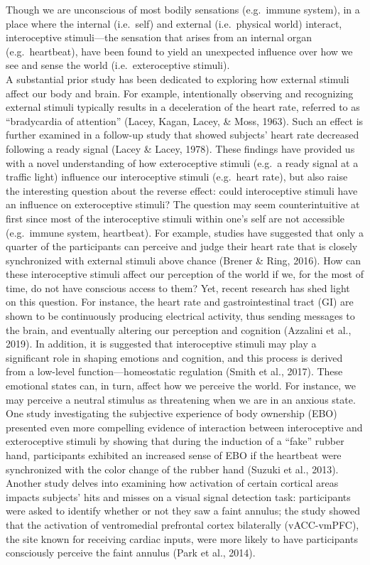 \documentclass[
  man]{apa6}
\begin{document}
Though we are unconscious of most bodily sensations (e.g.~immune system), in a place where the internal (i.e.~self) and external (i.e.~physical world) interact, interoceptive stimuli---the sensation that arises from an internal organ (e.g.~heartbeat), have been found to yield an unexpected influence over how we see and sense the world (i.e.~exteroceptive stimuli).\\
A substantial prior study has been dedicated to exploring how external stimuli affect our body and brain. For example, intentionally observing and recognizing external stimuli typically results in a deceleration of the heart rate, referred to as ``bradycardia of attention'' (Lacey, Kagan, Lacey, \& Moss, 1963). Such an effect is further examined in a follow-up study that showed subjects' heart rate decreased following a ready signal (Lacey \& Lacey, 1978). These findings have provided us with a novel understanding of how exteroceptive stimuli (e.g.~a ready signal at a traffic light) influence our interoceptive stimuli (e.g.~heart rate), but also raise the interesting question about the reverse effect: could interoceptive stimuli have an influence on exteroceptive stimuli? The question may seem counterintuitive at first since most of the interoceptive stimuli within one's self are not accessible (e.g.~immune system, heartbeat). For example, studies have suggested that only a quarter of the participants can perceive and judge their heart rate that is closely synchronized with external stimuli above chance (Brener \& Ring, 2016). How can these interoceptive stimuli affect our perception of the world if we, for the most of time, do not have conscious access to them? Yet, recent research has shed light on this question.
For instance, the heart rate and gastrointestinal tract (GI) are shown to be continuously producing electrical activity, thus sending messages to the brain, and eventually altering our perception and cognition (Azzalini et al., 2019). In addition, it is suggested that interoceptive stimuli may play a significant role in shaping emotions and cognition, and this process is derived from a low-level function---homeostatic regulation (Smith et al., 2017). These emotional states can, in turn, affect how we perceive the world. For instance, we may perceive a neutral stimulus as threatening when we are in an anxious state.
One study investigating the subjective experience of body ownership (EBO) presented even more compelling evidence of interaction between interoceptive and exteroceptive stimuli by showing that during the induction of a ``fake'' rubber hand, participants exhibited an increased sense of EBO if the heartbeat were synchronized with the color change of the rubber hand (Suzuki et al., 2013). Another study delves into examining how activation of certain cortical areas impacts subjects' hits and misses on a visual signal detection task: participants were asked to identify whether or not they saw a faint annulus; the study showed that the activation of ventromedial prefrontal cortex bilaterally (vACC-vmPFC), the site known for receiving cardiac inputs, were more likely to have participants consciously perceive the faint annulus (Park et al., 2014).
\end{document}
